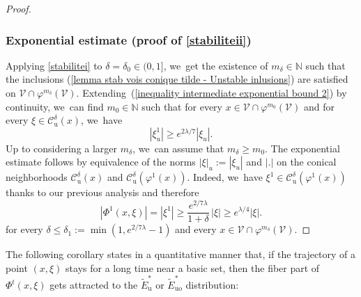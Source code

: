 \documentclass[11pt]{article}
\newcommand{\ru}{\mathrm{u}}
\newcommand{\ruo}{\mathrm{uo}}
\theoremstyle{definition}
\theoremstyle{plain}
\newcommand{\Ccal}{\mathcal{C}}
\newcommand{\N}{\mathbb{N}}
\newcommand{\Vcal}{\mathcal{V}}
\begin{document}
\begin{proof}
\subsubsection*{Exponential estimate (proof of \eqref{stabiliteii})} Applying \eqref{stabilitei} to $\delta=\delta_0\in(0,1]$, we~get the existence of $m_{\delta} \in \N$ such that the inclusions (\ref{lemma stab vois conique tilde - Unstable inlusions}) are satisfied on $\Vcal \cap \varphi^{m_{\delta}} (\Vcal)$. Extending~(\ref{inequality intermediate exponential bound 2}) by continuity, we~can find $m_0 \in \N$ such that for every $x \in \Vcal \cap \varphi^{m_0} (\Vcal)$ and for every $\xi \in \Ccal_{\ru}^{\delta} (x)$, we~have
\[
|\xi_u^1| \geq e^{2\lambda / 7 } |\xi_u|.
\]
Up to considering a larger $m_{\delta}$, we~can assume that $m_{\delta} \geq m_0$. The exponential estimate follows by equivalence of the norms $|\xi |_u:= |\xi_u|$ and $|.|$ on the conical neighborhoods $\Ccal_\ru^{\delta}(x)$ and $\Ccal_\ru^{\delta}(\varphi^1(x))$. Indeed, we~have $\xi^1 \in \Ccal_\ru^{\delta} (\varphi^1 (x))$ thanks to our previous analysis and therefore
\[
|\Phi^1 (x,\xi)| = |\xi^1| \geq \frac{e^{2/7\lambda}}{1 + \delta}\, |\xi| \geq e^{\lambda /4} |\xi|.
\]
for every $\delta \leq \delta_1:= \min (1, e^{2/7\lambda} - 1)$ and every $x \in \Vcal \cap \varphi^{m_{\delta}} (\Vcal)$.
\end{proof}

The following corollary states in a quantitative manner that, if the trajectory of a point $(x,\xi)$ stays for a long time near a basic set, then the fiber part of $\Phi^t (x,\xi)$ gets attracted to the $\widetilde{E}_\ru^*$ or $\widetilde{E}_{\ruo}^*$ distribution:
\end{document}
